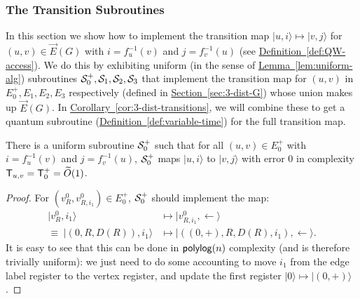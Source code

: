 \documentclass{theoretics}
\renewcommand{\sec}[1]{\hyperref[sec:#1]{Section~\ref*{sec:#1}}}
\newcommand{\lem}[1]{\hyperref[lem:#1]{Lemma~\ref*{lem:#1}}}
\newcommand{\cor}[1]{\hyperref[cor:#1]{Corollary~\ref*{cor:#1}}}
\newcommand{\defin}[1]{\hyperref[def:#1]{Definition~\ref*{def:#1}}}
\def\ket#1{{\lvert}#1\rangle}
\renewcommand{\>}{\rangle}
\newcommand{\<}{\langle}
\renewcommand{\(}{\left(}
\renewcommand{\)}{\right)}
\begin{document}
\subsubsection{The Transition Subroutines}\label{sec:3-dist-transitions}

In this section we show how to implement the transition map  $\ket{u,i}{\mapsto}\ket{v,j}$ for $(u,v)\in\overrightarrow{E}(G)$ with $i=f_u^{-1}(v)$ and $j=f_v^{-1}(u)$ (see \defin{QW-access}). We do this by exhibiting uniform (in the sense of \lem{uniform-alg}) subroutines ${\cal S}_0^{+},{\cal S}_1,{\cal S}_2,{\cal S}_3$ that implement the transition map for $(u,v)$ in $E_0^{+},E_1,E_2,E_3$ respectively (defined in \sec{3-dist-G}) whose union makes up $\overrightarrow{E}(G)$. In \cor{3-dist-transitions}, we will combine these to get a quantum subroutine (\defin{variable-time}) for the full transition map. 

\begin{lemma}\label{lem:3-dist-T1}
There is a uniform subroutine ${\cal S}_0^{+}$ such that for all $(u,v)\in E_0^{+}$ with $i=f_u^{-1}(v)$ and $j=f_v^{-1}(u)$, ${\cal S}_0^+$ maps $\ket{u,i}$ to $\ket{v,j}$ with error 0 in complexity ${\sf T}_{u,v}={\sf T}_0^+=\widetilde{O}(1)$.
\end{lemma}
\begin{proof}
For $(v^0_{R},v^0_{R,i_1})\in E_0^+$, ${\cal S}_0^+$ should implement the map:
\begin{align*}
\ket{v^0_{R},i_1} &\mapsto \ket{v^0_{R,i_1},\leftarrow}\\
\equiv \; 
\ket{(0,R,D(R)),i_1} &\mapsto \ket{((0,+),R,D(R),i_1),\leftarrow}.
\end{align*}
It is easy to see that this can be done in ${\sf polylog}(n)$ complexity (and is therefore trivially uniform): we just need to do some accounting to move $i_1$ from the edge label register to the vertex register, and update the first register $\ket{0}\mapsto \ket{(0,+)}$. 
\end{proof}
\end{document}

